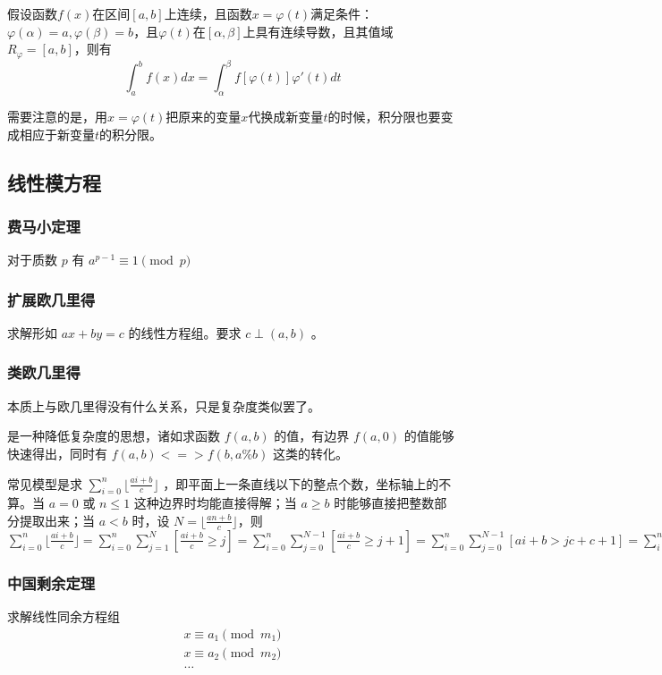\documentclass[UTF-8]{ctexart}
\begin{document}
	假设函数$f(x)$在区间$[a,b]$上连续，且函数$x=\varphi(t)$满足条件：$\varphi(\alpha)=a,\varphi(\beta)=b$，且$\varphi(t)$在$[\alpha,\beta]$上具有连续导数，且其值域$R_\varphi=[a,b]$，则有  
	$$\int _ a^b f(x)dx=\int _ {\alpha}^{\beta} f[\varphi(t)]\varphi'(t)dt$$  
	
	需要注意的是，用$x=\varphi(t)$把原来的变量$x$代换成新变量$t$的时候，积分限也要变成相应于新变量$t$的积分限。
	\subsection{线性模方程}
	\subsubsection{费马小定理}
	对于质数 $p$ 有 $a^{p-1} \equiv 1 \pmod p$
	\subsubsection{扩展欧几里得}
	求解形如 $ax+by=c$ 的线性方程组。要求 $c \perp (a,b)$ 。
	\subsubsection{类欧几里得}
	本质上与欧几里得没有什么关系，只是复杂度类似罢了。
	
	是一种降低复杂度的思想，诸如求函数 $f(a,b)$ 的值，有边界 $f(a,0)$ 的值能够快速得出，同时有 $f(a,b) <=> f(b,a\%b)$ 这类的转化。
	
	常见模型是求 $\sum_{i=0}^{n}\lfloor \frac{ai+b}{c} \rfloor$ ，即平面上一条直线以下的整点个数，坐标轴上的不算。当 $a=0$ 或 $n \le 1$ 这种边界时均能直接得解；当 $a \ge b$ 时能够直接把整数部分提取出来；当 $a < b$ 时，设 $N=\lfloor \frac{an+b}{c} \rfloor $，则 $\sum_{i=0}^{n}\lfloor \frac{ai+b}{c} \rfloor=\sum_{i=0}^{n} \sum_{j=1}^N [\frac{ai+b}{c} \ge j]=\sum_{i=0}^n \sum_{j=0}^{N-1} [\frac{ai+b}{c} \ge j+1]=\sum_{i=0}^n \sum_{j=0}^{N-1} [ai+b>jc+c+1]=\sum_{i=0}^n \sum_{j=0}^{N-1} [i>\frac{jc+c+1-b}{a}]=\sum_{j=0}^{N-1} n-\lfloor \frac{jc+c+1-b}{a} \rfloor=n(N-1)-\sum_{i=0}^{N-1} \lfloor \frac{ic+(c+1-b)}{a} \rfloor $
	\subsubsection{中国剩余定理}
	求解线性同余方程组 
	\begin{align}
	x \equiv a _ 1 \pmod m _ 1 \nonumber\\ 
	x \equiv a _ 2 \pmod m _ 2 \nonumber\\
	\dots\nonumber
	\end{align}
	
\end{document}
